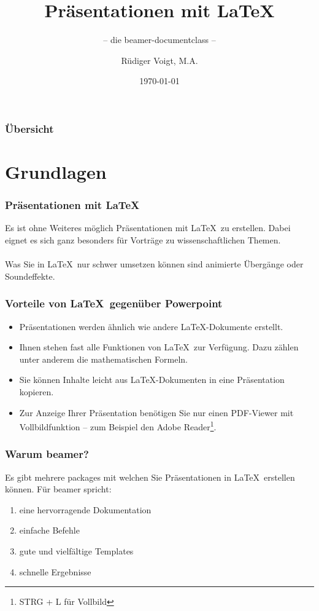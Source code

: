 \documentclass{beamer}
\title{Präsentationen mit \LaTeX}
\subtitle{-- die beamer-documentclass --}
\author{Rüdiger Voigt, M.A.}
\date{\today}
\begin{document}
\begin{frame}
\titlepage
\end{frame}

\begin{frame}
\frametitle{Übersicht}
\tableofcontents
\end{frame}

\section{Grundlagen}

\begin{frame}
\frametitle{Präsentationen mit \LaTeX}
Es ist ohne Weiteres möglich Präsentationen mit \LaTeX\ zu erstellen. Dabei eignet es sich ganz besonders für Vorträge zu wissenschaftlichen Themen.\\
\ \\
Was Sie in \LaTeX\ nur schwer umsetzen können sind animierte Übergänge oder Soundeffekte.
\end{frame}

\begin{frame}
\frametitle{Vorteile von \LaTeX\ gegenüber Powerpoint}
\begin{itemize}
\item Präsentationen werden ähnlich wie andere \LaTeX-Dokumente erstellt.
\item Ihnen stehen fast alle Funktionen von \LaTeX\ zur Verfügung. Dazu zählen unter anderem die mathematischen Formeln.
\item Sie können Inhalte leicht aus \LaTeX-Dokumenten in eine Präsentation kopieren.
\item Zur Anzeige Ihrer Präsentation benötigen Sie nur einen PDF-Viewer mit Vollbildfunktion -- zum Beispiel den Adobe Reader\footnote{STRG + L für Vollbild}.
\end{itemize}
\end{frame}

\begin{frame}
\frametitle{Warum beamer?}
Es gibt mehrere packages mit welchen Sie Präsentationen in \LaTeX\ erstellen können. Für beamer spricht:
\begin{enumerate}
\item eine hervorragende Dokumentation
\item einfache Befehle
\item gute und vielfältige Templates
\item schnelle Ergebnisse
\end{enumerate}
\end{frame}
\end{document}
